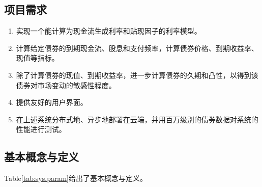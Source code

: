 \subsection{项目需求}
\begin{enumerate}
\item 实现一个能计算为现金流生成利率和贴现因子的利率模型。
\item 计算给定债券的到期现金流、股息和支付频率，计算债券价格、到期收益率、现值等指标。
\item 除了计算债券的现值、到期收益率，进一步计算债券的久期和凸性，以得到该债券对市场变动的敏感性程度。
\item 提供友好的用户界面。
\item 在上述系统分布式地、异步地部署在云端，并用百万级别的债券数据对系统的性能进行测试。
\end{enumerate}


\subsection{基本概念与定义}
Table\ref{tab:sys.param}给出了基本概念与定义。

